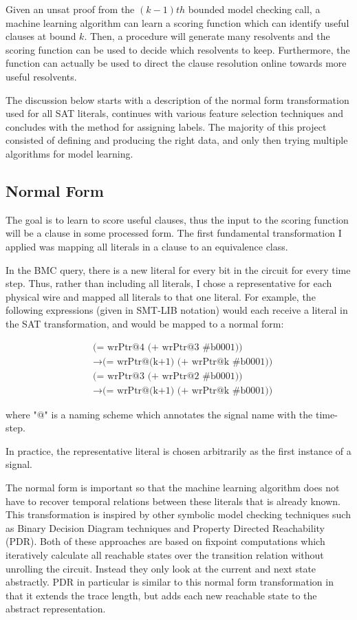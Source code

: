 \documentclass[letterpaper]{article} %
\begin{document}
Given an unsat proof from the $(k-1)th$ bounded model checking call, a machine learning algorithm can learn a scoring function which can identify useful clauses at bound $k$. Then, a procedure will generate many resolvents and the scoring function can be used to decide which resolvents to keep. Furthermore, the function can actually be used to direct the clause resolution online towards more useful resolvents.

The discussion below starts with a description of the normal form transformation used for all SAT literals, continues with various feature selection techniques and concludes with the method for assigning labels. The majority of this project consisted of defining and producing the right data, and only then trying multiple algorithms for model learning.

\subsection{Normal Form}
The goal is to learn to score useful clauses, thus the input to the scoring function will be a clause in some processed form. The first fundamental transformation I applied was mapping all literals in a clause to an equivalence class.

In the BMC query, there is a new literal for every bit in the circuit for every time step. Thus, rather than including all literals, I chose a representative for each physical wire and mapped all literals to that one literal. For example, the following expressions (given in SMT-LIB notation) would each receive a literal in the SAT transformation, and would be mapped to a normal form:

\begin{equation*}
\begin{split}
&\text{(= wrPtr@4 (+ wrPtr@3 \#b0001))} \\
&\to \text{(= wrPtr@(k+1) (+ wrPtr@k \#b0001))} \\
&\text{(= wrPtr@3 (+ wrPtr@2 \#b0001))}\\
&\to \text{(= wrPtr@(k+1) (+ wrPtr@k \#b0001))}
\end{split}
\end{equation*}

\noindent where "@" is a naming scheme which annotates the signal name with the time-step.

In practice, the representative literal is chosen arbitrarily as the first instance of a signal. 

The normal form is important so that the machine learning algorithm does not have to recover temporal relations between these literals that is already known. This transformation is inspired by other symbolic model checking techniques such as Binary Decision Diagram techniques and Property Directed Reachability (PDR). Both of these approaches are based on fixpoint computations which iteratively calculate all reachable states over the transition relation without unrolling the circuit. Instead they only look at the current and next state abstractly. PDR in particular is similar to this normal form transformation in that it extends the trace length, but adds each new reachable state to the abstract representation.
\end{document}
